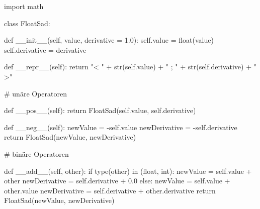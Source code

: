 \documentclass[
  letterpaper,
  DIV=11,
  oneside]{scrreprt}
\newenvironment{Shaded}{\begin{snugshade}}{\end{snugshade}}
\newcommand{\BuiltInTok}[1]{\textcolor[rgb]{0.00,0.23,0.31}{#1}}
\newcommand{\CommentTok}[1]{\textcolor[rgb]{0.37,0.37,0.37}{#1}}
\newcommand{\ControlFlowTok}[1]{\textcolor[rgb]{0.00,0.23,0.31}{#1}}
\newcommand{\FloatTok}[1]{\textcolor[rgb]{0.68,0.00,0.00}{#1}}
\newcommand{\FunctionTok}[1]{\textcolor[rgb]{0.28,0.35,0.67}{#1}}
\newcommand{\ImportTok}[1]{\textcolor[rgb]{0.00,0.46,0.62}{#1}}
\newcommand{\KeywordTok}[1]{\textcolor[rgb]{0.00,0.23,0.31}{#1}}
\newcommand{\NormalTok}[1]{\textcolor[rgb]{0.00,0.23,0.31}{#1}}
\newcommand{\OperatorTok}[1]{\textcolor[rgb]{0.37,0.37,0.37}{#1}}
\newcommand{\StringTok}[1]{\textcolor[rgb]{0.13,0.47,0.30}{#1}}
\newcommand{\VariableTok}[1]{\textcolor[rgb]{0.07,0.07,0.07}{#1}}
\theoremstyle{definition}
\theoremstyle{definition}
\theoremstyle{remark}
\begin{document}
\begin{Shaded}
\begin{Highlighting}[]
\ImportTok{import}\NormalTok{ math}

\KeywordTok{class}\NormalTok{ FloatSad:}

    \KeywordTok{def} \FunctionTok{\_\_init\_\_}\NormalTok{(}\VariableTok{self}\NormalTok{, value, derivative }\OperatorTok{=} \FloatTok{1.0}\NormalTok{):}
        \VariableTok{self}\NormalTok{.value }\OperatorTok{=} \BuiltInTok{float}\NormalTok{(value)}
        \VariableTok{self}\NormalTok{.derivative }\OperatorTok{=}\NormalTok{ derivative}

    \KeywordTok{def} \FunctionTok{\_\_repr\_\_}\NormalTok{(}\VariableTok{self}\NormalTok{):}
        \ControlFlowTok{return} \StringTok{"\textless{} "} \OperatorTok{+} \BuiltInTok{str}\NormalTok{(}\VariableTok{self}\NormalTok{.value) }\OperatorTok{+} \StringTok{" ; "} \OperatorTok{+} \BuiltInTok{str}\NormalTok{(}\VariableTok{self}\NormalTok{.derivative) }\OperatorTok{+} \StringTok{" \textgreater{}"}


    \CommentTok{\# unäre Operatoren}

    \KeywordTok{def} \FunctionTok{\_\_pos\_\_}\NormalTok{(}\VariableTok{self}\NormalTok{):}
        \ControlFlowTok{return}\NormalTok{ FloatSad(}\VariableTok{self}\NormalTok{.value, }\VariableTok{self}\NormalTok{.derivative)}
    
    \KeywordTok{def} \FunctionTok{\_\_neg\_\_}\NormalTok{(}\VariableTok{self}\NormalTok{):}
\NormalTok{        newValue }\OperatorTok{=} \OperatorTok{{-}}\VariableTok{self}\NormalTok{.value}
\NormalTok{        newDerivative }\OperatorTok{=} \OperatorTok{{-}}\VariableTok{self}\NormalTok{.derivative}
        \ControlFlowTok{return}\NormalTok{ FloatSad(newValue, newDerivative)}
    

    \CommentTok{\# binäre Operatoren}

    \KeywordTok{def} \FunctionTok{\_\_add\_\_}\NormalTok{(}\VariableTok{self}\NormalTok{, other):}
        \ControlFlowTok{if} \BuiltInTok{type}\NormalTok{(other) }\KeywordTok{in}\NormalTok{ (}\BuiltInTok{float}\NormalTok{, }\BuiltInTok{int}\NormalTok{):}
\NormalTok{            newValue }\OperatorTok{=} \VariableTok{self}\NormalTok{.value }\OperatorTok{+}\NormalTok{ other}
\NormalTok{            newDerivative }\OperatorTok{=} \VariableTok{self}\NormalTok{.derivative }\OperatorTok{+} \FloatTok{0.0}
        \ControlFlowTok{else}\NormalTok{:}
\NormalTok{            newValue }\OperatorTok{=} \VariableTok{self}\NormalTok{.value }\OperatorTok{+}\NormalTok{ other.value}
\NormalTok{            newDerivative }\OperatorTok{=} \VariableTok{self}\NormalTok{.derivative }\OperatorTok{+}\NormalTok{ other.derivative}
        \ControlFlowTok{return}\NormalTok{ FloatSad(newValue, newDerivative)}


\end{Highlighting}
\end{Shaded}
\end{document}
